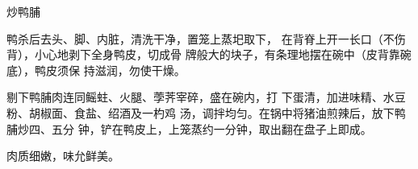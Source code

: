 \begin{recipe}{炒鸭脯}

\ingredients


\cooking

鸭杀后去头、脚、内脏，清洗干净，置笼上蒸圯取下， 在背脊上开一长口（不伤背），小心地剥下全身鸭皮，切成骨 牌般大的块子，有条理地摆在碗中（皮背靠碗底），鸭皮须保 持滋润，勿使干燥。

剔下鸭脯肉连同鳐蛀、火腿、荸荠宰碎，盛在碗内，打 下蛋清，加进味精、水豆粉、胡椒面、食盐、绍酒及一杓鸡 汤，调拌均匀。在锅中将猪油煎辣后，放下鸭脯炒四、五分 钟，铲在鸭皮上，上笼蒸约一分钟，取出翻在盘子上即成。

\notes

肉质细嫩，味允鲜美。

\end{recipe}

